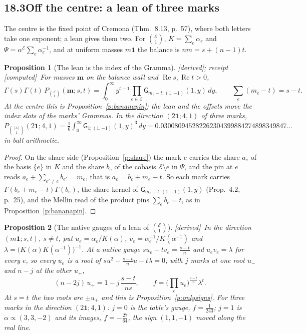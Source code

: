 \documentclass[11pt]{article}
\newcommand{\cE}{\mathcal E}
\newcommand{\one}{\mathbf 1}
\newcommand{\mvec}{\mathbf m}
\newcommand{\sG}{\mathsf G}
\DeclareMathOperator{\re}{Re}
\theoremstyle{plain}
\newtheorem{proposition}{Proposition}[section]
\theoremstyle{definition}
\theoremstyle{remark}
\newcommand{\derived}{\textup{[derived]}}
\newcommand{\computed}{\textup{[computed]}}
\begin{document}
\subsection*{18.3\quad Off the centre: a lean of three marks}

The centre is the fixed point of Cremona (Thm.~8.13, p.~57), where both letters take one exponent; a lean gives them two. For $\binom{\cE}1$, $K=\sum_e\alpha_e$ and $\Psi=\alpha^{\cE}\sum_e\alpha_e^{-1}$, and at uniform masses $m\one$ the balance is $nm=s+(n-1)t$.

\begin{proposition}[The lean is the index of the Gramma]\label{p:leanindex}\derived; receipt \computed\
For masses $\mvec$ on the balance wall and $\re s,\re t>0$,
\[
\Gamma(s)\Gamma(t)\,P_{\binom{\cE}1}(\mvec;s,t)=\int_0^\infty y^{t-1}\prod_{e\in\cE}\sG_{m_e-t;(1,-1)}(1,y)\,dy ,\qquad \sum_e(m_e-t)=s-t .
\]
At the centre this is Proposition~\ref{p:bananapin}; the lean and the offsets move the index slots of the marks' Grammas. In the direction $(2\one;4,1)$ of three marks, $P_{\binom{[3]}1}(2\one;4,1)=\frac16\int_0^\infty\sG_{1;(1,-1)}(1,y)^3\,dy=0.030080945282262304399884274898349847\ldots$ in ball arithmetic.
\end{proposition}

\begin{proof}
On the share side (Proposition~\ref{p:share}) the mark $e$ carries the share $a_e$ of the basis $\{e\}$ in $K$ and the share $b_e$ of the cobasis $\cE\setminus e$ in $\Psi$, and the pin at $e$ reads $a_e+\sum_{e'\ne e}b_{e'}=m_e$, that is $a_e=b_e+m_e-t$. So each mark carries $\Gamma(b_e+m_e-t)\Gamma(b_e)$, the share kernel of $\sG_{m_e-t;(1,-1)}(1,y)$ (Prop.~4.2, p.~25), and the Mellin read of the product pins $\sum_eb_e=t$, as in Proposition~\ref{p:bananapin}.
\end{proof}

\begin{proposition}[The native gauges of a lean of $\binom{\cE}1$]\label{p:leangauges}\derived\
In the direction $(m\one;s,t)$, $s\ne t$, put $u_e=\alpha_e/K(\alpha)$, $v_e=\alpha_e^{-1}/K(\alpha^{-1})$ and $\lambda=\big(K(\alpha)K(\alpha^{-1})\big)^{-1}$. At a native gauge $su_e-tv_e=\frac{s-t}n$ and $u_ev_e=\lambda$ for every $e$, so every $u_e$ is a root of $su^2-\frac{s-t}nu-t\lambda=0$; with $j$ marks at one root $u_-$ and $n-j$ at the other $u_+$,
\[
(n-2j)\,u_+=1-j\,\frac{s-t}{ns},\qquad f=\Big(\prod_eu_e\Big)^{\frac{s-t}n}\lambda^t .
\]
At $s=t$ the two roots are $\pm u_+$ and this is Proposition~\ref{p:onlysigns}. For three marks in the direction $(2\one;4,1)$: $j=0$ is the table's gauge, $f=\frac1{243}$; $j=1$ is $\alpha\propto(3,3,-2)$ and its images, $f=-\frac{27}{64}$, the sign $(1,1,-1)$ moved along the real line.
\end{proposition}
\end{document}
